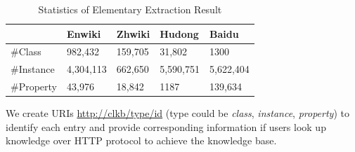 \documentclass[runningheads,a4paper]{llncs}
\begin{document}
\vspace{-0.5cm}
\begin{table}[hb]
    \small
    \centering
    \caption{Statistics of Elementary Extraction Result}
    \label{tab:extract-result}
        \begin{tabular}{|p{2.5cm}|p{2cm}|p{2cm}|p{2cm}|p{2cm}|}
            \hline
                       & Enwiki    & Zhwiki   & Hudong    & Baidu     \\ \hline
            \#Class    & 982,432   & 159,705  & 31,802    & 1300      \\ \hline
            \#Instance & 4,304,113 & 662,650  & 5,590,751 & 5,622,404 \\ \hline
            \#Property & 43,976    & 18,842   & 1187      & 139,634   \\ \hline
        \end{tabular}
\end{table}
\vspace{-0.5cm}

We create URIs \url{http://clkb/type/id} (type could be \textit{class}, \textit{instance}, \textit{property}) to identify each entry and provide corresponding information if users look up knowledge over HTTP protocol to achieve the knowledge base.
\end{document}
